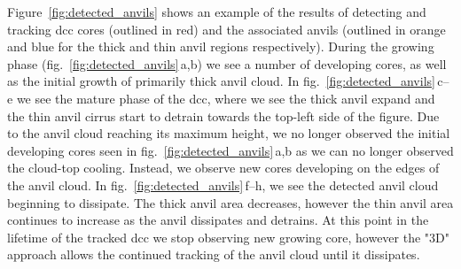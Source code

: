 Figure~\ref{fig:detected_anvils} shows an example of the results of detecting and tracking \acrshort{dcc} cores (outlined in red) and the associated anvils (outlined in orange and blue for the thick and thin anvil regions respectively).
During the growing phase (fig.~\ref{fig:detected_anvils}\,a,b) we see a number of developing cores, as well as the initial growth of primarily thick anvil cloud.
In fig.~\ref{fig:detected_anvils}\,c--e we see the mature phase of the \acrshort{dcc}, where we see the thick anvil expand and the thin anvil cirrus start to detrain towards the top-left side of the figure.
Due to the anvil cloud reaching its maximum height, we no longer observed the initial developing cores seen in fig.~\ref{fig:detected_anvils}\,a,b as we can no longer observed the cloud-top cooling.
Instead, we observe new cores developing on the edges of the anvil cloud.
In fig.~\ref{fig:detected_anvils}\,f--h, we see the detected anvil cloud beginning to dissipate.
The thick anvil area decreases, however the thin anvil area continues to increase as the anvil dissipates and detrains.
At this point in the lifetime of the tracked \acrshort{dcc} we stop observing new growing core, however the "3D" approach allows the continued tracking of the anvil cloud until it dissipates.


